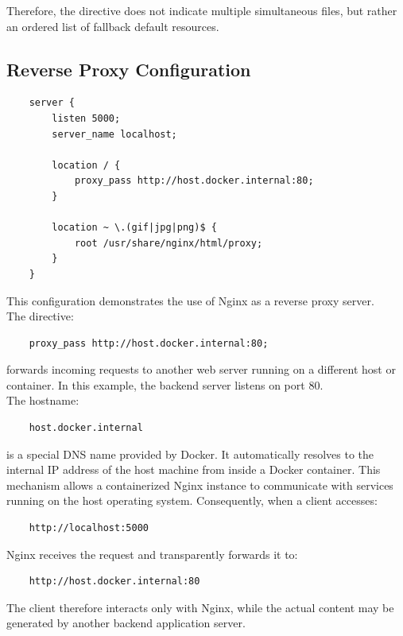 \documentclass{scrbook}
\begin{document}
	Therefore, the directive does not indicate multiple simultaneous files, but rather an ordered list of fallback default resources.
	
	\subsection{Reverse Proxy Configuration}
	
	\begin{lstlisting}
	server {
		listen 5000;
		server_name localhost;
	
		location / {
			proxy_pass http://host.docker.internal:80;
		}
	
		location ~ \.(gif|jpg|png)$ {
			root /usr/share/nginx/html/proxy;
		}
	}
	\end{lstlisting}
	
	This configuration demonstrates the use of Nginx as a reverse proxy server.\\
	
	\newpage
	The directive:
	
	\begin{verbatim}
	proxy_pass http://host.docker.internal:80;
	\end{verbatim}
	
	forwards incoming requests to another web server running on a different host or container. In this example, the backend server listens on port 80.\\
	
	The hostname:
	
	\begin{verbatim}
	host.docker.internal
	\end{verbatim}
	
	is a special DNS name provided by Docker. It automatically resolves to the internal IP address of the host machine from inside a Docker container. This mechanism allows a containerized Nginx instance to communicate with services running on the host operating system. Consequently, when a client accesses:
	
	\begin{verbatim}
	http://localhost:5000
	\end{verbatim}
	
	Nginx receives the request and transparently forwards it to:
	
	\begin{verbatim}
	http://host.docker.internal:80
	\end{verbatim}
	
	The client therefore interacts only with Nginx, while the actual content may be generated by another backend application server.\\
	
\end{document}
